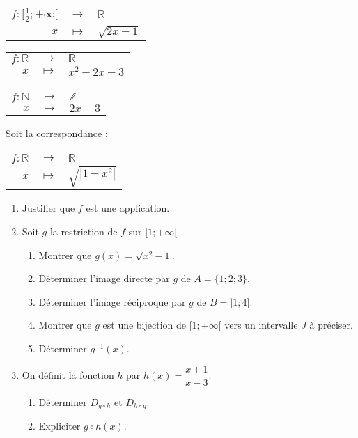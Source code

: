 \documentclass{article}
\begin{document}
\bigskip

\renewcommand{\arraystretch}{1.3}
\begin{tabular}{rcl}
    \( f : [\frac{1}{2}; +\infty[ \) & \( \to \) & \( \mathbb{R} \) \\
    \( x \) & \( \mapsto \) & \( \sqrt{2x - 1} \)
\end{tabular}

\bigskip

\renewcommand{\arraystretch}{1.3}
\begin{tabular}{rcl}
    \( f : \mathbb{R} \) & \( \to \) & \( \mathbb{R} \) \\
    \( x \) & \( \mapsto \) & \( x^2 - 2x - 3 \)
\end{tabular}

\bigskip

\renewcommand{\arraystretch}{1.3}
\begin{tabular}{rcl}
    \( f : \mathbb{N} \) & \( \to \) & \( \mathbb{Z} \) \\
    \( x \) & \( \mapsto \) & \( 2x - 3 \)
\end{tabular}

\bigskip


\bigskip

Soit la correspondance :

\bigskip

\renewcommand{\arraystretch}{1.3}
\begin{tabular}{rcl}
    \( f : \mathbb{R} \) & \( \to \) & \( \mathbb{R} \) \\
    \( x \) & \( \mapsto \) & \( \sqrt{|1 - x^2|} \)
\end{tabular}

\bigskip

\begin{enumerate}
    \item Justifier que \( f \) est une application.
    \item Soit \( g \) la restriction de \( f \) sur \([1; +\infty[\)
    \begin{enumerate}
        \item Montrer que \( g(x) = \sqrt{x^2 - 1} \).
        \item Déterminer l’image directe par \( g \) de \( A = \{1;2;3\} \).
        \item Déterminer l’image réciproque par \( g \) de \( B = ]1;4] \).
        \item  Montrer que \( g \) est une bijection de \([1; +\infty[\) vers un intervalle \( J \) à préciser.
        \item  Déterminer \( g^{-1}(x) \).
    \end{enumerate}
    \item On définit la fonction \( h \) par \( h(x) = \dfrac{x+1}{x-3} \).
    \begin{enumerate}
        \item Déterminer \( D_{g \circ h} \) et \( D_{h \circ g} \).
        \item Expliciter \( g \circ h(x) \).
    \end{enumerate}
\end{enumerate}
\end{document}
